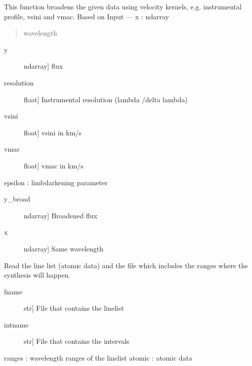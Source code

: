 \documentclass[letterpaper,10pt,english]{sphinxmanual}
\begin{document}
\begin{fulllineitems}
\label{\detokenize{index:FASMA.synthetic.broadening}}
This function broadens the given data using velocity kernels,
e.g. instrumental profile, vsini and vmac.
Based on 
Input
—\sphinxhyphen{}
x : ndarray
\begin{quote}

wavelength
\end{quote}
\begin{description}
\item[{y}] \leavevmode{[}ndarray{]}
flux

\item[{resolution}] \leavevmode{[}float{]}
Instrumental resolution (lambda /delta lambda)

\item[{vsini}] \leavevmode{[}float{]}
vsini in km/s

\item[{vmac}] \leavevmode{[}float{]}
vmac in km/s

\end{description}

epsilon : limb\sphinxhyphen{}darkening parameter
\begin{description}
\item[{y\_broad}] \leavevmode{[}ndarray{]}
Broadened flux

\item[{x}] \leavevmode{[}ndarray{]}
Same wavelength

\end{description}

\end{fulllineitems}


\begin{fulllineitems}
\label{\detokenize{index:FASMA.synthetic.read_linelist}}
Read the line list (atomic data) and the file which includes the ranges
where the synthesis will happen.
\begin{description}
\item[{fname}] \leavevmode{[}str{]}
File that contains the linelist

\item[{intname}] \leavevmode{[}str{]}
File that contains the intervals

\end{description}

ranges : wavelength ranges of the linelist
atomic : atomic data

\end{fulllineitems}
\end{document}
